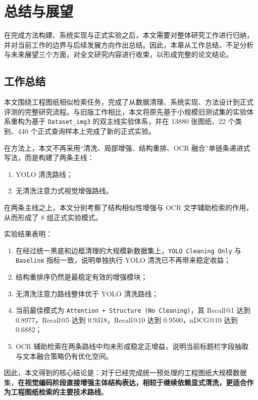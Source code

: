 \chapter{总结与展望}

在完成方法构建、系统实现与正式实验之后，本文需要对整体研究工作进行归纳，并对当前工作的边界与后续发展方向作出总结。因此，本章从工作总结、不足分析与未来展望三个方面，对全文研究内容进行收束，以形成完整的论文结论。

\section{工作总结}

本文围绕工程图纸相似检索任务，完成了从数据清理、系统实现、方法设计到正式评测的完整研究流程。与旧版工作相比，本文将原先基于小规模旧测试集的实验体系重构为基于 \texttt{Dataset\_img3} 的双主线实验体系，并在 13880 张图纸、22 个类别、440 个正式查询样本上完成了新的正式实验。

在方法上，本文不再采用“清洗、局部增强、结构重排、OCR 融合”单链条递进式写法，而是构建了两条主线：
\begin{enumerate}
  \item YOLO 清洗路线；
  \item 无清洗注意力式视觉增强路线。
\end{enumerate}
在两条主线之上，本文分别考察了结构相似性增强与 OCR 文字辅助检索的作用，从而形成了 8 组正式实验模式。

实验结果表明：
\begin{enumerate}
  \item 在经过统一黑底和边框清理的大规模新数据集上，\texttt{YOLO Cleaning Only} 与 \texttt{Baseline} 指标一致，说明单独执行 YOLO 清洗已不再带来稳定收益；
  \item 结构重排序仍然是最稳定有效的增强模块；
  \item 无清洗注意力路线整体优于 YOLO 清洗路线；
  \item 当前最佳模式为 \texttt{Attention + Structure (No Cleaning)}，其 Recall@1 达到 0.8977，Recall@5 达到 0.9318，Recall@10 达到 0.9500，nDCG@10 达到 0.6882；
  \item OCR 辅助检索在两条路线中均未形成稳定正增益，说明当前标题栏字段抽取与文本融合策略仍有优化空间。
\end{enumerate}

因此，本文得到的核心结论是：对于已经完成统一预处理的工程图纸大规模数据集，\textbf{在视觉编码阶段直接增强主体结构表达，相较于继续依赖显式清洗，更适合作为工程图纸检索的主要技术路线}。

